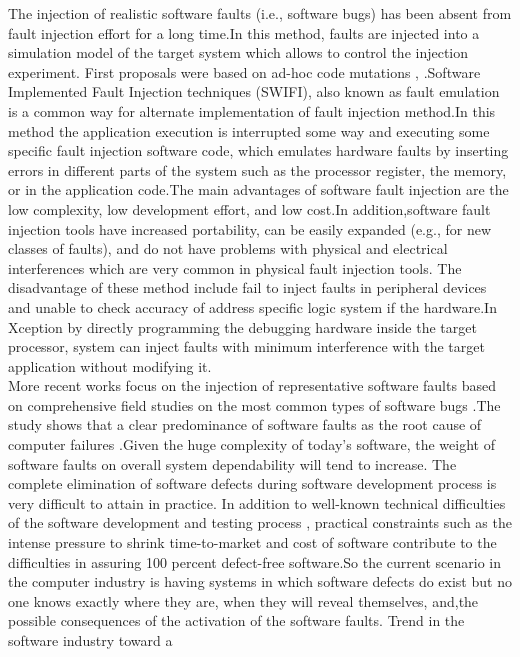 The injection of realistic software faults (i.e., software
bugs) has been absent from fault injection effort for a
long time.In this method, faults are injected into a simulation model of the target system which allows to control the injection experiment. First proposals were based on ad-hoc code
mutations \cite{22}, \cite{23}.Software Implemented Fault Injection techniques
(SWIFI), also known as fault emulation is a common way for alternate implementation of fault injection method.In this method the application execution is interrupted some way and executing some  specific fault injection software code, which emulates hardware faults by inserting errors in different parts of the system such as the processor register, the memory, or in the application code.The main advantages of software fault injection are the low complexity, low development effort, and low cost.In addition,software fault injection tools have increased portability, can be easily expanded (e.g., for new classes of faults), and do not have problems with
physical and electrical interferences which are very common in physical fault injection tools. The disadvantage of these method include fail to inject faults in peripheral devices and unable to check accuracy of address specific logic system if the hardware.In Xception by directly programming the debugging hardware
inside the target processor, system can inject faults with minimum interference with the target application without modifying it.\\
\newline
More recent works focus on the injection of representative software faults based on comprehensive field studies on the most common types of software bugs  \cite{4}.The study
shows that a clear predominance of software faults as the root
cause of computer failures .Given the huge complexity of today's software, the weight of
software faults on overall system dependability will tend
to increase. The complete elimination of software defects
during software development process is very difficult to
attain in practice. In addition to well-known technical
difficulties of the software development and testing
process  \cite{5}, practical constraints such as the intense
pressure to shrink time-to-market and cost of software
contribute to the difficulties in assuring 100 percent
defect-free software.So the current scenario in
the computer industry is having systems in which
software defects do exist but no one knows exactly where
they are, when they will reveal themselves, and,the possible consequences of the activation of the software faults. Trend in the software industry toward a
